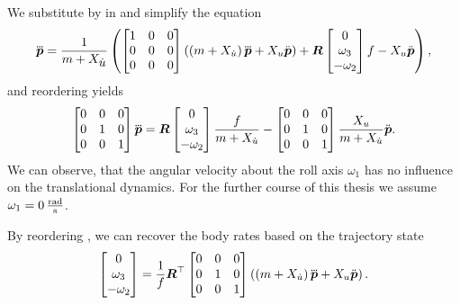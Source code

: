 We substitute \fp by  in  and simplify the equation
\begin{equation}
	\mbox{$\dddot{\bm{p}}$} = 
	\frac{1}{m + X_{\mbox{$\dot{u}$}}}
	\left(
		\begin{bmatrix}
			1 & 0 & 0 \\
			0 & 0 & 0 \\
			0 & 0 & 0
		\end{bmatrix}
		\left(
			\left(m + X_{\dot{u}}\right)
			\mbox{$\dddot{\bm{p}}$}
			+ X_u \mbox{$\ddot{\bm{p}}$}
		\right)
		+
		\mbox{$\bm{R}$}
		\begin{bmatrix}
			0 \\
			\omega_3 \\
			-\omega_2
		\end{bmatrix}
		f
		- X_u \mbox{$\ddot{\bm{p}}$}
	\right),
\end{equation}
and reordering yields
\begin{equation}
	\label{eq:jerk-vs-bodyrates}
	\begin{bmatrix}
		0 & 0 & 0\\
		0 & 1 & 0\\
		0 & 0 & 1
	\end{bmatrix}
	\mbox{$\dddot{\bm{p}}$} = 
	\mbox{$\bm{R}$}
	\begin{bmatrix}
		0 \\
		\omega_3 \\
		- \omega_2
	\end{bmatrix}
	\frac{f}{m + X_{\dot{u}}}
	-
	\begin{bmatrix}
		0 & 0 & 0 \\
		0 & 1 & 0 \\
		0 & 0 & 1
	\end{bmatrix}
	\frac{X_u}{m + X_{\dot{u}}}
	\mbox{$\ddot{\bm{p}}$}
	.
\end{equation}
We can observe, that the angular velocity about the roll axis $\omega_1$ has no influence on the translational dynamics. For the further course of this thesis we assume $\omega_1 = \unit[0]{\frac{rad}{s}}$.

By reordering , we can recover the body rates based on the trajectory state
\begin{equation}
	\label{eq:body-rate-relation}
	\begin{bmatrix}
		0 \\
		\omega_3 \\
		- \omega_2
	\end{bmatrix}
	=
	\frac{1}{f}
	\mbox{$\bm{R}$}^\top
	\begin{bmatrix}
		0 & 0 & 0 \\
		0 & 1 & 0 \\
		0 & 0 & 1
	\end{bmatrix}
	\left(
		\left(
			m + X_{\dot{u}}
		\right)
		\mbox{$\dddot{\bm{p}}$}
		+ X_u \mbox{$\ddot{\bm{p}}$}
	\right)
	.
\end{equation}

